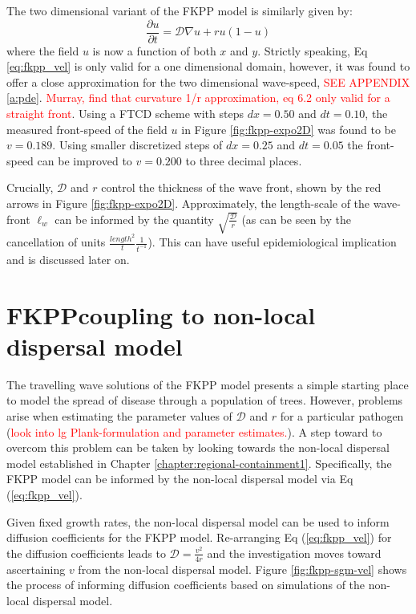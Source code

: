 The two dimensional variant of the FKPP model is similarly given by:
\begin{equation}
    \frac{\partial u}{\partial t} = \mathcal{D}\nabla u + ru(1 - u)
\end{equation}
where the field $u$ is now a function of both $x$ and $y$. %
Strictly speaking, Eq \ref{eq:fkpp_vel} is only valid for a one dimensional domain, however, it was found to offer a close approximation for the two dimensional wave-speed,  \textcolor{red}{SEE APPENDIX \ref{a:pde}}. %
\textcolor{red}{Murray, find that curvature 1/r approximation, eq 6.2 only valid for a straight front}. %
Using a FTCD scheme with steps $dx = 0.50$ and $dt = 0.10$, the measured front-speed of the field $u$ in Figure \ref{fig:fkpp-expo2D} was found to be $v=0.189$. %
Using smaller discretized steps of $dx = 0.25$ and $dt = 0.05$ the front-speed can be improved to $v=0.200$ to three decimal places.

Crucially, $\mathcal{D}$ and $r$ control the thickness of the wave front, shown by the red arrows in Figure \ref{fig:fkpp-expo2D}. %
Approximately, the length-scale of the wave-front $\ell_{w}$ can be informed by the quantity $\sqrt{ \frac{\mathcal{D}}{r}}$ (as can be seen by the cancellation of units $\frac{length^2}{t} \frac{1}{t^{-1}}$). %
This can have useful epidemiological implication and is  discussed later on. 

\section{FKPP\textemdash coupling to non-local dispersal model}

The travelling wave solutions of the FKPP model presents a simple starting place to model the spread of disease through a population of trees. %
However, problems arise when estimating the parameter values of $\mathcal{D}$ and $r$ for a particular pathogen (\textcolor{red}{look into lg Plank-formulation and parameter estimates.}). %
A step toward to overcom this problem %
can be taken by looking towards the non-local dispersal model established in Chapter \ref{chapter:regional-containment1}. %
Specifically, the FKPP model can be informed by the non-local dispersal model via Eq (\ref{eq:fkpp_vel}).

Given fixed growth rates, the non-local dispersal model can be used to inform diffusion coefficients for the FKPP model. %
Re-arranging Eq (\ref{eq:fkpp_vel}) for the diffusion coefficients leads to $\mathcal{D} = \frac{v^2}{4r}$ and the %
investigation moves toward ascertaining $v$ from the non-local dispersal model. %
Figure \ref{fig:fkpp-sgm-vel} shows the process of informing diffusion coefficients based on simulations of the non-local dispersal model. 

